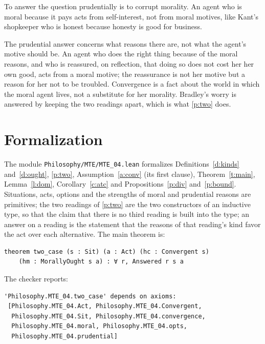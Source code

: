 \documentclass{situationist-preprint}
\begin{document}
\begin{objection}
To answer the question prudentially is to corrupt morality. An agent who is moral because it pays acts from self-interest, not from moral motives, like Kant's shopkeeper who is honest because honesty is good for business.
\end{objection}

\begin{reply}
The prudential answer concerns what reasons there are, not what the agent's motive should be. An agent who does the right thing because of the moral reasons, and who is reassured, on reflection, that doing so does not cost her her own good, acts from a moral motive; the reassurance is not her motive but a reason for her not to be troubled. Convergence is a fact about the world in which the moral agent lives, not a substitute for her morality. Bradley's worry is answered by keeping the two readings apart, which is what \ref{p:two} does.
\end{reply}

\section{Formalization}

The module \nolinkurl{Philosophy/MTE/MTE_04.lean} formalizes Definitions~\ref{d:kinds} and~\ref{d:ought}, \ref{p:two}, Assumption~\ref{a:conv} (its first clause), Theorem~\ref{t:main}, Lemma~\ref{l:dom}, Corollary~\ref{c:atc} and Propositions~\ref{p:div} and~\ref{p:bound}. Situations, acts, options and the strengths of moral and prudential reasons are primitives; the two readings of \ref{p:two} are the two constructors of an inductive type, so that the claim that there is no third reading is built into the type; an answer on a reading is the statement that the reasons of that reading's kind favor the act over each alternative. The main theorem is:

\begin{lstlisting}[basicstyle=\ttfamily\footnotesize]
theorem two_case (s : Sit) (a : Act) (hc : Convergent s)
    (hm : MorallyOught s a) : ∀ r, Answered r s a
\end{lstlisting}

\noindent The checker reports:

\begin{lstlisting}[basicstyle=\ttfamily\footnotesize]
'Philosophy.MTE_04.two_case' depends on axioms:
 [Philosophy.MTE_04.Act, Philosophy.MTE_04.Convergent,
  Philosophy.MTE_04.Sit, Philosophy.MTE_04.convergence,
  Philosophy.MTE_04.moral, Philosophy.MTE_04.opts,
  Philosophy.MTE_04.prudential]
\end{lstlisting}
\end{document}
